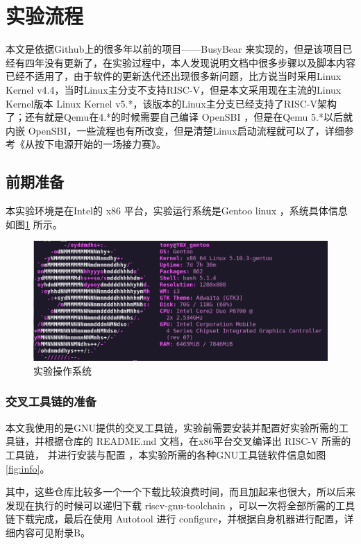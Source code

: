 \section{实验流程}
本文是依据Github上的很多年以前的项目——BusyBear \cite{BusyBear} 来实现的，但是该项目已经有四年没有更新了，在实验过程中，本人发现说明文档中很多步骤以及脚本内容已经不适用了，由于软件的更新迭代还出现很多新问题，比方说当时采用Linux Kernel v4.4，当时Linux主分支不支持RISC-V，但是本文采用现在主流的Linux Kernel版本 Linux Kernel v5.*，该版本的Linux主分支已经支持了RISC-V架构了；还有就是Qemu在4.*的时候需要自己编译 OpenSBI ，但是在Qemu 5.*以后就内嵌 OpenSBI，一些流程也有所改变，但是清楚Linux启动流程就可以了，详细参考《从按下电源开始的一场接力赛》\cite{从按下电源开始的一场接力赛}。

\subsection{前期准备}
本实验环境是在Intel的 x86 平台，实验运行系统是Gentoo linux \cite{Gentoo_AMD64_Handbook}，系统具体信息如图\ref{fig:gentoo} 所示。


\begin{figure}[htbp]
  \centering %
  \includegraphics[width=0.8 \textwidth]{figs/Process/gentoo_Logo.eps}
  \caption{实验操作系统}
  \label{fig:gentoo} %
\end{figure}

\subsubsection{交叉工具链的准备}
本文我使用的是GNU提供的交叉工具链，实验前需要安装并配置好实验所需的工具链，并根据仓库的 README.md 文档，在x86平台交叉编译出 RISC-V 所需的工具链， 并进行安装与配置  \cite{riscv-binutils-gdb} \cite{riscv-dejagnu} \cite{riscv-gcc} \cite{riscv-glibc} \cite{riscv-newlib} \cite{riscv-pk} ，本实验所需的各种GNU工具链软件信息如图\ref{fig:info}。

其中，这些仓库比较多一个一个下载比较浪费时间，而且加起来也很大，所以后来发现在执行的时候可以递归下载 riscv-gnu-toolchain \cite{riscv-gnu-toolchain} ，可以一次将全部所需的工具链下载完成，最后在使用 Autotool 进行 configure，并根据自身机器进行配置，详细内容可见附录B。


